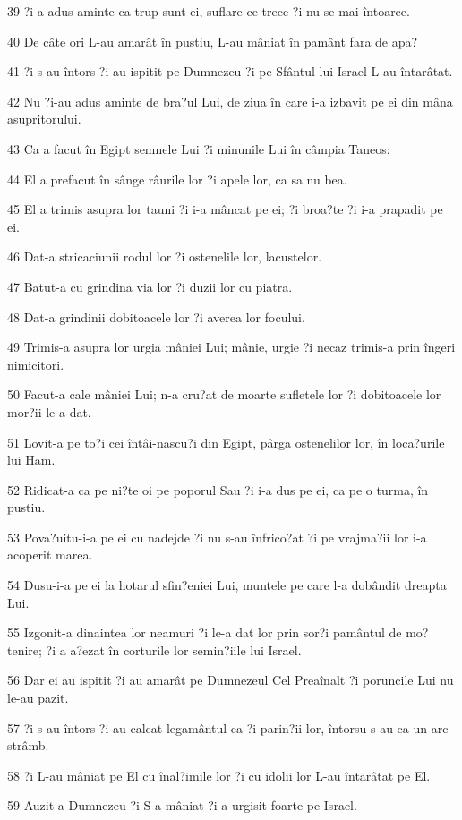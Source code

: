 \par 39 ?i-a adus aminte ca trup sunt ei, suflare ce trece ?i nu se mai întoarce.
\par 40 De câte ori L-au amarât în pustiu, L-au mâniat în pamânt fara de apa?
\par 41 ?i s-au întors ?i au ispitit pe Dumnezeu ?i pe Sfântul lui Israel L-au întarâtat.
\par 42 Nu ?i-au adus aminte de bra?ul Lui, de ziua în care i-a izbavit pe ei din mâna asupritorului.
\par 43 Ca a facut în Egipt semnele Lui ?i minunile Lui în câmpia Taneos:
\par 44 El a prefacut în sânge râurile lor ?i apele lor, ca sa nu bea.
\par 45 El a trimis asupra lor tauni ?i i-a mâncat pe ei; ?i broa?te ?i i-a prapadit pe ei.
\par 46 Dat-a stricaciunii rodul lor ?i ostenelile lor, lacustelor.
\par 47 Batut-a cu grindina via lor ?i duzii lor cu piatra.
\par 48 Dat-a grindinii dobitoacele lor ?i averea lor focului.
\par 49 Trimis-a asupra lor urgia mâniei Lui; mânie, urgie ?i necaz trimis-a prin îngeri nimicitori.
\par 50 Facut-a cale mâniei Lui; n-a cru?at de moarte sufletele lor ?i dobitoacele lor mor?ii le-a dat.
\par 51 Lovit-a pe to?i cei întâi-nascu?i din Egipt, pârga ostenelilor lor, în loca?urile lui Ham.
\par 52 Ridicat-a ca pe ni?te oi pe poporul Sau ?i i-a dus pe ei, ca pe o turma, în pustiu.
\par 53 Pova?uitu-i-a pe ei cu nadejde ?i nu s-au înfrico?at ?i pe vrajma?ii lor i-a acoperit marea.
\par 54 Dusu-i-a pe ei la hotarul sfin?eniei Lui, muntele pe care l-a dobândit dreapta Lui.
\par 55 Izgonit-a dinaintea lor neamuri ?i le-a dat lor prin sor?i pamântul de mo?tenire; ?i a a?ezat în corturile lor semin?iile lui Israel.
\par 56 Dar ei au ispitit ?i au amarât pe Dumnezeul Cel Preaînalt ?i poruncile Lui nu le-au pazit.
\par 57 ?i s-au întors ?i au calcat legamântul ca ?i parin?ii lor, întorsu-s-au ca un arc strâmb.
\par 58 ?i L-au mâniat pe El cu înal?imile lor ?i cu idolii lor L-au întarâtat pe El.
\par 59 Auzit-a Dumnezeu ?i S-a mâniat ?i a urgisit foarte pe Israel.
